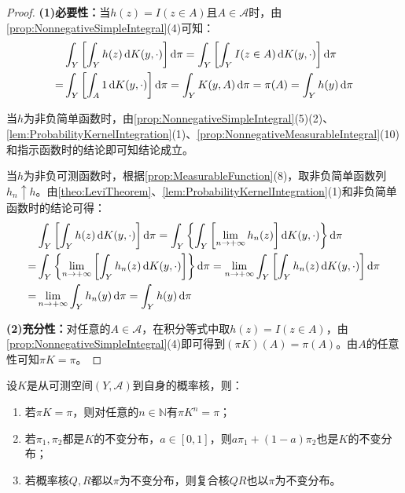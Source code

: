 \begin{proof}
	\textbf{(1)必要性：}当$h(z)=I(z\in A)$且$A\in\mathscr{A}$时，由\cref{prop:NonnegativeSimpleIntegral}(4)可知：
	\begin{align*}
		&\int_{Y}\left[\int_{Y}h(z)\dif K(y,\cdot)\right]\dif\pi=\int_{Y}\left[\int_{Y}I(z\in A)\dif K(y,\cdot)\right]\dif\pi \\
		=&\int_{Y}\left[\int_{A}1\dif K(y,\cdot)\right]\dif\pi=\int_{Y}K(y,A)\dif\pi=\pi(A)=\int_{Y}h(y)\dif\pi
	\end{align*}\par
	当$h$为非负简单函数时，由\cref{prop:NonnegativeSimpleIntegral}(5)(2)、\cref{lem:ProbabilityKernelIntegration}(1)、\cref{prop:NonnegativeMeasurableIntegral}(10)和指示函数时的结论即可知结论成立。\par
	当$h$为非负可测函数时，根据\cref{prop:MeasurableFunction}(8)，取非负简单函数列$h_n\uparrow h$。由\cref{theo:LeviTheorem}、\cref{lem:ProbabilityKernelIntegration}(1)和非负简单函数时的结论可得：
	\begin{align*}
		&\int_{Y}\left[\int_{Y}h(z)\dif K(y,\cdot)\right]\dif\pi=\int_{Y}\left\{\int_{Y}\left[\lim_{n\to+\infty}h_n(z)\right]\dif K(y,\cdot)\right\}\dif\pi \\
		=&\int_{Y}\left\{\lim_{n\to+\infty}\left[\int_{Y}h_n(z)\dif K(y,\cdot)\right]\right\}\dif\pi=\lim_{n\to+\infty}\int_{Y}\left[\int_{Y}h_n(z)\dif K(y,\cdot)\right]\dif\pi \\
		=&\lim_{n\to+\infty}\int_{Y}h_n(y)\dif\pi=\int_{Y}h(y)\dif\pi
	\end{align*}\par
	\textbf{(2)充分性：}对任意的$A\in\mathscr{A}$，在积分等式中取$h(z)=I(z\in A)$，由\cref{prop:NonnegativeSimpleIntegral}(4)即可得到$(\pi K)(A)=\pi(A)$。由$A$的任意性可知$\pi K=\pi$。
\end{proof}
\begin{property}\label{prop:InvariantDistribution}
	设$K$是从可测空间$(Y,\mathscr{A})$到自身的概率核，则：
	\begin{enumerate}
		\item 若$\pi K=\pi$，则对任意的$n\in\mathbb{N}$有$\pi K^n=\pi$；
		\item 若$\pi_1,\pi_2$都是$K$的不变分布，$a\in[0,1]$，则$a\pi_1+(1-a)\pi_2$也是$K$的不变分布；
		\item 若概率核$Q,R$都以$\pi$为不变分布，则复合核$QR$也以$\pi$为不变分布。
	\end{enumerate}
\end{property}
